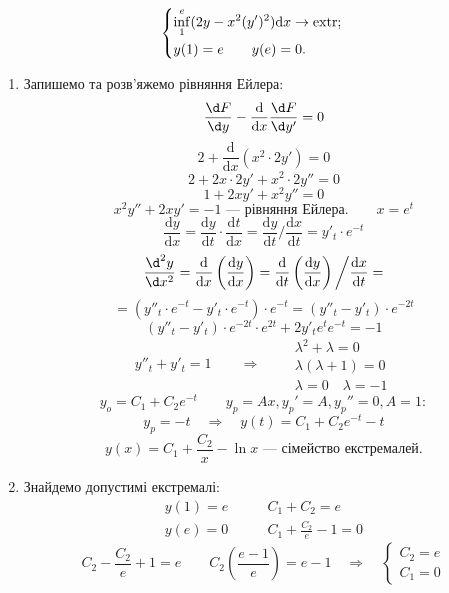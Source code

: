 \begin{example}
 \[
\begin{dcases}
\inf\limits_{1}^{e} (2y - x^2 (y')^2) \mathrm{d} x \to \mathrm{extr}; \\
y(1) = e \qquad y(e) = 0 .
\end{dcases} \]
\begin{enumerate}
  \item Запишемо та розв'яжемо рівняння Ейлера:
  \[
   \frac{\d F}{\d y} - \frac{\mathrm{d}}{\mathrm{d} x} \frac{\d F}{\d y'} = 0
  \]
  \[
   2 + \frac{\mathrm{d}}{\mathrm{d} x} (x^2 \cdot 2 y') = 0
  \]
  \[
   2 + 2 x \cdot 2 y' + x^2 \cdot 2 y'' = 0
  \]
  \[
   1 + 2 x y' + x^2 y'' = 0
  \]
  \[
   x^2 y'' + 2 x y' = -1 \text{ --- рівняння Ейлера.} \qquad x = e^t
  \]
  \[
   \frac{\mathrm{d} y}{\mathrm{d} x} = \frac{\mathrm{d} y}{ \mathrm{d} t} \cdot \frac{\mathrm{d} t}{ \mathrm{d} x} = \frac{\mathrm{d} y}{ \mathrm{d} t}  \bigg/ \frac{\mathrm{d} x}{ \mathrm{d} t} = y'_t \cdot e^{-t}
  \]
  \[
   \frac{\d^2 y}{ \d x^2} = \frac{\mathrm{d}}{\mathrm{d} x} \left( \frac{\mathrm{d} y}{\mathrm{d} x} \right) = \frac{\mathrm{d}}{\mathrm{d} t} \left( \frac{\mathrm{d} y}{\mathrm{d} x} \right)
   \bigg/ \frac{\mathrm{d} x}{ \mathrm{d} t} =
  \]
  \[
   = (y''_t \cdot e^{-t} - y'_t \cdot e^{-t}) \cdot e^{-t} = (y''_t - y'_t) \cdot e^{-2t}
  \]
  \[
   (y''_t - y'_t) \cdot e^{-2t} \cdot e^{2t} + 2y'_t e^t e^{-t} = -1
  \]
  \[
   y''_t + y'_t  = 1 \qquad \Longrightarrow \qquad \begin{gathered}
    \lambda^2 + \lambda = 0\\
    \lambda(\lambda+ 1)= 0\\
    \lambda  = 0 \quad \lambda = -1
   \end{gathered}
  \]
  \[
   y_o = C_1 + C_2 e^{-t} \qquad y_{p} = A x , y_{p}' = A, y_{p}'' = 0, A = 1:
  \]
  \[
   y_p = -t \quad \Longrightarrow \quad y(t) = C_1 + C_2 e^{-t} - t
  \]
  \[
   y(x) = C_1 + \frac{C_2}{x}  - \ln x \textit{ --- сімейство екстремалей.}
  \]
  \item Знайдемо допустимі екстремалі:
  \[
\begin{split}
y(1) = e &\qquad  C_1 + C_2 = e \\
y(e) = 0 &\qquad C_1 + \frac{C_2}{e} -1 = 0
\end{split}
  \]
  \[
   C_2 - \frac{C_2}{e} + 1 = e \qquad C_2 \left( \frac{e-1}{e} \right) = e - 1 \quad \Longrightarrow \quad
   \begin{cases}
    C_2 = e \\ C_1 = 0
   \end{cases}
\]
\end{enumerate}
\end{example}
